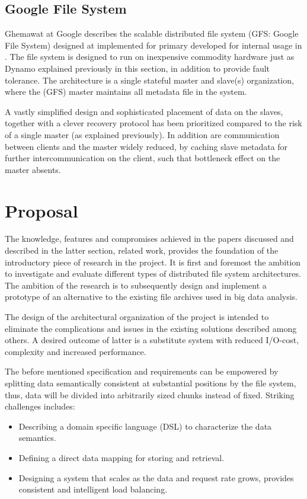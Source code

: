 \subsection*{Google File System}
Ghemawat \etal at Google describes the scalable distributed file system (GFS: Google File System) designed at implemented for primary developed for internal usage in \cite{Ghemawat:2003:GFS:945445.945450}. The file system is designed to run on inexpensive commodity hardware just as \eg Dynamo explained previously in this section, in addition to provide fault tolerance. The architecture is a single stateful master and slave(s) organization, where the (GFS) master maintains all metadata file in the system. 
\newline

A vastly simplified design and sophisticated placement of data on the slaves, together with a clever recovery protocol has been prioritized compared to the risk of a single master (as explained previously). In addition are communication between clients and the master widely reduced, by caching slave metadata for further intercommunication on the client, such that bottleneck effect on the master absents.

\section{Proposal} \label{sec:proposal}
The knowledge, features and compromises achieved in the papers discussed and described in the latter section, related work, provides the foundation of the introductory piece of research in the project. It is first and foremost the ambition to investigate and evaluate different types of distributed file system architectures. The ambition of the research is to subsequently design and implement a prototype of an alternative to the existing file archives used in big data analysis.
\newline

The design of the architectural organization of the project is intended to eliminate the complications and issues in the existing solutions described among others. A desired outcome of latter is a substitute system with reduced I/O-cost, complexity and increased performance. 

The before mentioned specification and requirements can be empowered by splitting data semantically consistent at substantial positions by the file system, thus, data will be divided into arbitrarily sized chunks instead of fixed. Striking challenges includes:
\vspace*{3mm}
\begin{itemize}
	\item Describing a domain specific language (DSL) to characterize the data semantics.
	\item Defining a direct data mapping for storing and retrieval.
	\item Designing a system that scales as the data and request rate grows, \ie provides consistent and intelligent load balancing.
\end{itemize}
\vspace*{3mm}

